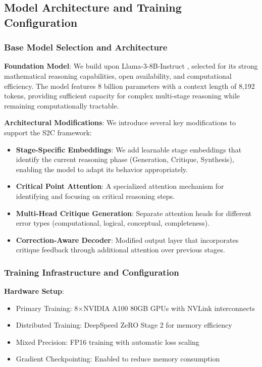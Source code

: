 \documentclass[10pt,twocolumn]{article}
\newcommand{\ssc}{\textsc{S2C}}
\begin{document}
\subsection{Model Architecture and Training Configuration}

\subsubsection{Base Model Selection and Architecture}

\textbf{Foundation Model}: We build upon Llama-3-8B-Instruct \cite{touvron2023llama2}, selected for its strong mathematical reasoning capabilities, open availability, and computational efficiency. The model features 8 billion parameters with a context length of 8,192 tokens, providing sufficient capacity for complex multi-stage reasoning while remaining computationally tractable.

\textbf{Architectural Modifications}: We introduce several key modifications to support the \ssc{} framework:

\begin{itemize}[leftmargin=*]
\item \textbf{Stage-Specific Embeddings}: We add learnable stage embeddings that identify the current reasoning phase (Generation, Critique, Synthesis), enabling the model to adapt its behavior appropriately.
\item \textbf{Critical Point Attention}: A specialized attention mechanism for identifying and focusing on critical reasoning steps.
\item \textbf{Multi-Head Critique Generation}: Separate attention heads for different error types (computational, logical, conceptual, completeness).
\item \textbf{Correction-Aware Decoder}: Modified output layer that incorporates critique feedback through additional attention over previous stages.
\end{itemize}

\subsubsection{Training Infrastructure and Configuration}

\textbf{Hardware Setup}:
\begin{itemize}[leftmargin=*]
\item Primary Training: 8×NVIDIA A100 80GB GPUs with NVLink interconnects
\item Distributed Training: DeepSpeed ZeRO Stage 2 for memory efficiency
\item Mixed Precision: FP16 training with automatic loss scaling
\item Gradient Checkpointing: Enabled to reduce memory consumption
\end{itemize}
\end{document}
